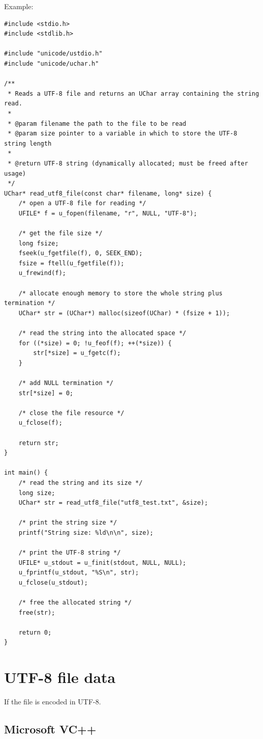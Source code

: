 Example:
\begin{Verbatim}
#include <stdio.h>
#include <stdlib.h>

#include "unicode/ustdio.h"
#include "unicode/uchar.h"

/**
 * Reads a UTF-8 file and returns an UChar array containing the string read.
 *
 * @param filename the path to the file to be read
 * @param size pointer to a variable in which to store the UTF-8 string length
 *
 * @return UTF-8 string (dynamically allocated; must be freed after usage)
 */
UChar* read_utf8_file(const char* filename, long* size) {
    /* open a UTF-8 file for reading */
    UFILE* f = u_fopen(filename, "r", NULL, "UTF-8");

    /* get the file size */
    long fsize;
    fseek(u_fgetfile(f), 0, SEEK_END);
    fsize = ftell(u_fgetfile(f));
    u_frewind(f);

    /* allocate enough memory to store the whole string plus termination */
    UChar* str = (UChar*) malloc(sizeof(UChar) * (fsize + 1));

    /* read the string into the allocated space */
    for ((*size) = 0; !u_feof(f); ++(*size)) {
        str[*size] = u_fgetc(f);
    }

    /* add NULL termination */
    str[*size] = 0;

    /* close the file resource */
    u_fclose(f);

    return str;
}

int main() {
    /* read the string and its size */
    long size;
    UChar* str = read_utf8_file("utf8_test.txt", &size);

    /* print the string size */
    printf("String size: %ld\n\n", size);

    /* print the UTF-8 string */
    UFILE* u_stdout = u_finit(stdout, NULL, NULL);
    u_fprintf(u_stdout, "%S\n", str);
    u_fclose(u_stdout);

    /* free the allocated string */
    free(str);

    return 0;
}
\end{Verbatim}
\section{UTF-8 file data}

If the file is encoded in UTF-8.

\subsection{Microsoft VC++}
\label{sec:wide-character_VC++}

